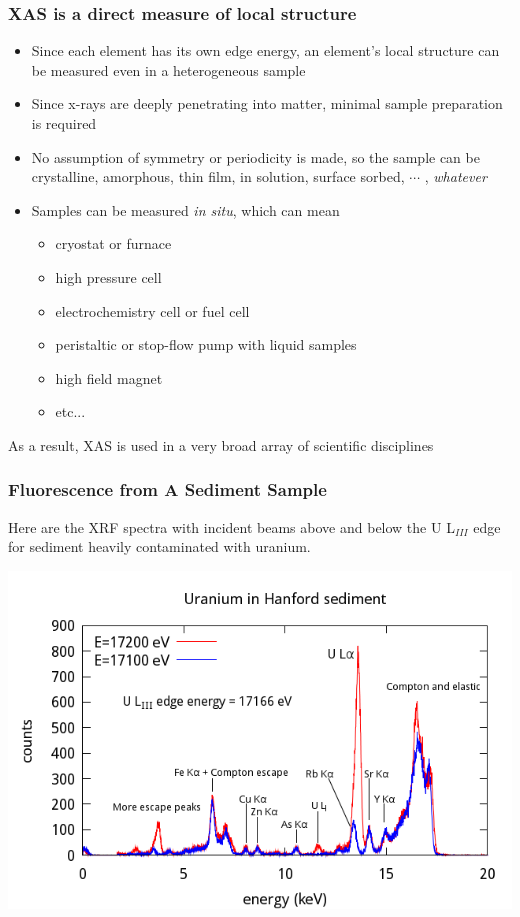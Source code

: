 \documentclass[10pt, xcolor=x11names, compress]{beamer}
\begin{document}
\begin{frame}
  \frametitle{XAS is a direct measure of local structure}

  \begin{itemize}
  \item Since each element has its own edge energy, an element's
    local structure can be measured even in a heterogeneous sample
  \item Since x-rays are deeply penetrating into matter, minimal
    sample preparation is required
  \item No assumption of symmetry or periodicity is made, so the
    sample can be crystalline, amorphous, thin film, in solution,
    surface sorbed, $\cdots$ , \textit{whatever}
  \item Samples can be measured \textit{in situ}, which can mean
    \begin{itemize}
    \item cryostat or furnace
    \item high pressure cell
    \item electrochemistry cell or fuel cell
    \item peristaltic or stop-flow pump with liquid samples
    \item high field magnet
    \item etc...
    \end{itemize}
  \end{itemize}

  \begin{exampleblock}{}
    \begin{center}
      As a result, XAS is used in a very broad array of scientific
      disciplines
    \end{center}
  \end{exampleblock}
\end{frame}

\begin{frame}
  \frametitle{Fluorescence from A Sediment Sample}
  \begin{center}
    Here are the XRF spectra with incident beams \alert{above} and
    {\color{Blue4}below} the U L$_{III}$ edge for sediment heavily
    contaminated with uranium.

    \includegraphics[width=0.7\linewidth]{xrf/xrf.png}
  \end{center}
\end{frame}
\end{document}
